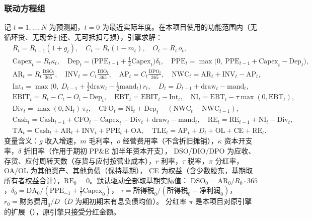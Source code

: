 \subsubsection{联动方程组}

记 $t=1,\dots,N$ 为预测期，$t=0$ 为最近实际年度。在本项目使用的功能范围内（无循环贷、无现金扫还、无可抵扣亏损），引擎求解：
\begin{align}
&R_t=R_{t-1}(1+g_t),\quad C_t=R_t(1-m_t),\quad O_t=R_t\,o_t, \label{eq:val-ts-is1}\\
&\text{Capex}_t=R_t\kappa_t,\quad \text{Dep}_t=\big(\text{PPE}_{t-1}+\tfrac12\text{Capex}_t\big)\delta_t,\quad
\text{PPE}_t=\max\!\big(0,\ \text{PPE}_{t-1}+\text{Capex}_t-\text{Dep}_t\big), \label{eq:val-ts-ppe}\\
&\text{AR}_t=R_t\tfrac{\text{DSO}_t}{365},\quad \text{INV}_t=C_t\tfrac{\text{DIO}_t}{365},\quad \text{AP}_t=C_t\tfrac{\text{DPO}_t}{365},\quad
\text{NWC}_t=\text{AR}_t+\text{INV}_t-\text{AP}_t, \label{eq:val-ts-wc}\\
&\text{Int}_t=\max\!\big(0,\ D_{t-1}+\tfrac12\text{draw}_t-\tfrac12\text{mand}_t\big)\,r_t,\quad D_t=D_{t-1}+\text{draw}_t-\text{mand}_t, \label{eq:val-ts-debt}\\
&\text{EBIT}_t=R_t-C_t-O_t-\text{Dep}_t,\quad \text{EBT}_t=\text{EBIT}_t-\text{Int}_t,\quad
\text{NI}_t=\text{EBT}_t-\tau\max(0,\text{EBT}_t), \label{eq:val-ts-is2}\\
&\text{Div}_t=\max(0,\text{NI}_t)\,\pi_t,\quad \text{CFO}_t=\text{NI}_t+\text{Dep}_t-(\text{NWC}_t-\text{NWC}_{t-1}), \label{eq:val-ts-cf}\\
&\text{Cash}_t=\text{Cash}_{t-1}+\text{CFO}_t-\text{Capex}_t-\text{Div}_t+\text{draw}_t-\text{mand}_t,\quad \text{RE}_t=\text{RE}_{t-1}+\text{NI}_t-\text{Div}_t, \label{eq:val-ts-cash}\\
&\text{TA}_t=\text{Cash}_t+\text{AR}_t+\text{INV}_t+\text{PPE}_t+\text{OA},\quad
\text{TLE}_t=\text{AP}_t+D_t+\text{OL}+\text{CE}+\text{RE}_t . \label{eq:val-ts-bs}
\end{align}
变量含义：$g$ 收入增速，$m$ 毛利率，$o$ 经营费用率（不含折旧摊销），$\kappa$ 资本开支率，$\delta$ 折旧率（作用于期初 PP\&E 加半年资本开支），
DSO/DIO/DPO 为应收、存货、应付周转天数（存货与应付按营业成本），$r$ 利率，$\tau$ 税率，$\pi$ 分红率，OA/OL 为其他资产、其他负债（保持基期），
CE 为权益（含少数股东，基期取所有者权益合计），$\text{RE}_0=0$。默认驱动全部取基期实际值：
$\text{DSO}_0=\text{AR}_0/R_0\cdot365$，$\delta_0=\text{DA}_0/(\text{PPE}_{-1}+\tfrac12\text{Capex}_0)$，
$\tau=\text{所得税}_0/(\text{所得税}_0+\text{净利润}_0)$，$r_0=\text{财务费用}_0/\overline{D}$（$\overline{D}$ 为期初期末有息负债均值）。
分红率 $\pi$ 是本项目对原引擎的扩展（），原引擎只接受分红金额。

